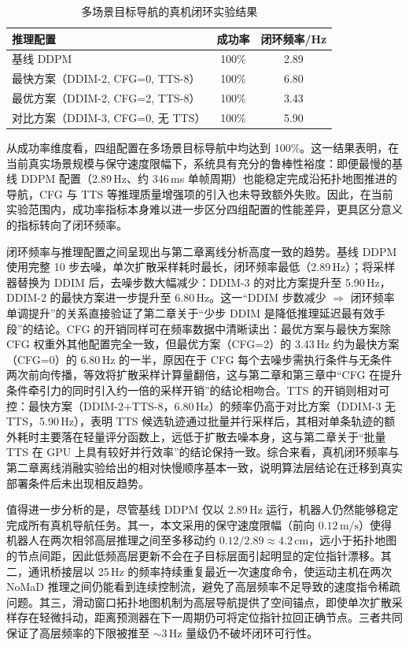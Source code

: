 \begin{table}[htbp]
    \centering
    \caption{多场景目标导航的真机闭环实验结果}
    \label{tab:real-multiscene-navigate}
    \begin{tabular}{lcc}
        \toprule
        推理配置 & 成功率 & 闭环频率/Hz \\
        \midrule
        基线 DDPM & 100\% & 2.89 \\
        最快方案（DDIM-2, CFG=0, TTS-8） & 100\% & 6.80 \\
        最优方案（DDIM-2, CFG=2, TTS-8） & 100\% & 3.43 \\
        对比方案（DDIM-3, CFG=0, 无 TTS） & 100\% & 5.90 \\
        \bottomrule
    \end{tabular}
\end{table}

从成功率维度看，四组配置在多场景目标导航中均达到 100\%。这一结果表明，在当前真实场景规模与保守速度限幅下，系统具有充分的鲁棒性裕度：即便最慢的基线 DDPM 配置（2.89\,Hz、约 346\,ms 单帧周期）也能稳定完成沿拓扑地图推进的导航，CFG 与 TTS 等推理质量增强项的引入也未导致额外失败。因此，在当前实验范围内，成功率指标本身难以进一步区分四组配置的性能差异，更具区分意义的指标转向了闭环频率。

闭环频率与推理配置之间呈现出与第二章离线分析高度一致的趋势。基线 DDPM 使用完整 10 步去噪，单次扩散采样耗时最长，闭环频率最低（2.89\,Hz）；将采样器替换为 DDIM 后，去噪步数大幅减少：DDIM-3 的对比方案提升至 5.90\,Hz，DDIM-2 的最快方案进一步提升至 6.80\,Hz。这一``DDIM 步数减少 $\Rightarrow$ 闭环频率单调提升''的关系直接验证了第二章关于``少步 DDIM 是降低推理延迟最有效手段''的结论。CFG 的开销同样可在频率数据中清晰读出：最优方案与最快方案除 CFG 权重外其他配置完全一致，但最优方案（CFG=2）的 3.43\,Hz 约为最快方案（CFG=0）的 6.80\,Hz 的一半，原因在于 CFG 每个去噪步需执行条件与无条件两次前向传播，等效将扩散采样计算量翻倍，这与第二章和第三章中``CFG 在提升条件牵引力的同时引入约一倍的采样开销''的结论相吻合。TTS 的开销则相对可控：最快方案（DDIM-2+TTS-8，6.80\,Hz）的频率仍高于对比方案（DDIM-3 无 TTS，5.90\,Hz），表明 TTS 候选轨迹通过批量并行采样后，其相对单条轨迹的额外耗时主要落在轻量评分函数上，远低于扩散去噪本身，这与第二章关于``批量 TTS 在 GPU 上具有较好并行效率''的结论保持一致。综合来看，真机闭环频率与第二章离线消融实验给出的相对快慢顺序基本一致，说明算法层结论在迁移到真实部署条件后未出现相反趋势。

值得进一步分析的是，尽管基线 DDPM 仅以 2.89\,Hz 运行，机器人仍然能够稳定完成所有真机导航任务。其一，本文采用的保守速度限幅（前向 $0.12\,\text{m/s}$）使得机器人在两次相邻高层推理之间至多移动约 $0.12/2.89\approx 4.2\,\text{cm}$，远小于拓扑地图的节点间距，因此低频高层更新不会在子目标层面引起明显的定位指针漂移。其二，通讯桥接层以 25\,Hz 的频率持续重复最近一次速度命令，使运动主机在两次 NoMaD 推理之间仍能看到连续控制流，避免了高层频率不足导致的速度指令稀疏问题。其三，滑动窗口拓扑地图机制为高层导航提供了空间锚点，即使单次扩散采样存在轻微抖动，距离预测器在下一周期仍可将定位指针拉回正确节点。三者共同保证了高层频率的下限被推至 $\sim 3\,\text{Hz}$ 量级仍不破坏闭环可行性。

